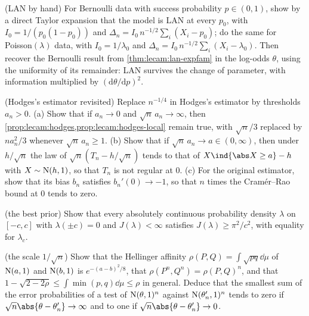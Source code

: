 \begin{refsection}
\begin{exercises}
\item \consolidation (LAN by hand) For Bernoulli data with success probability $p\in(0,1)$, show by a direct Taylor expansion that the model is LAN at every $p_0$, with $I_0=1/(p_0(1-p_0))$ and $\Delta_n=I_0\,n^{-1/2}\sum_i(X_i-p_0)$; do the same for Poisson$(\lambda)$ data, with $I_0=1/\lambda_0$ and $\Delta_n=I_0\,n^{-1/2}\sum_i(X_i-\lambda_0)$. Then recover the Bernoulli result from \cref{thm:lecam:lan-expfam} in the log-odds $\theta$, using the uniformity of its remainder: LAN survives the change of parameter, with information multiplied by $(\mathrm d\theta/\mathrm dp)^2$.\label{ex:lecam:bernoulli}

\item \consolidation\hard (Hodges's estimator revisited) Replace $n^{-1/4}$ in Hodges's estimator by thresholds $a_n>0$. (a) Show that if $a_n\to0$ and $\sqrt n\,a_n\to\infty$, then \cref{prop:lecam:hodges,prop:lecam:hodges-local} remain true, with $\sqrt n/3$ replaced by $na_n^2/3$ whenever $\sqrt n\,a_n\ge1$. (b) Show that if $\sqrt n\,a_n\to a\in(0,\infty)$, then under $h/\sqrt n$ the law of $\sqrt n(T_n-h/\sqrt n)$ tends to that of $X\ind\{\abs X\ge a\}-h$ with $X\sim\mathrm{N}(h,1)$, so that $T_n$ is not regular at $0$. (c) For the original estimator, show that its bias $b_n$ satisfies $b_n'(0)\to-1$, so that $n$ times the Cramér--Rao bound at $0$ tends to zero. \label{ex:lecam:hodges}

\item \consolidation\hard (the best prior) Show that every absolutely continuous probability density $\lambda$ on $[-c,c]$ with $\lambda(\pm c)=0$ and $J(\lambda)<\infty$ satisfies $J(\lambda)\ge\pi^2/c^2$, with equality for $\lambda_c$. \label{ex:lecam:prior}

\item \consolidation (the scale $1/\sqrt n$) Show that the Hellinger affinity $\rho(P,Q)=\int\sqrt{pq}\dd\mu$ of $\mathrm{N}(a,1)$ and $\mathrm{N}(b,1)$ is $e^{-(a-b)^2/8}$, that $\rho(P^n,Q^n)=\rho(P,Q)^n$, and that $1-\sqrt{2-2\rho}\le\int\min(p,q)\dd\mu\le\rho$ in general. Deduce that the smallest sum of the error probabilities of a test of $\mathrm{N}(\theta,1)^n$ against $\mathrm{N}(\theta_n',1)^n$ tends to zero if $\sqrt n\abs{\theta-\theta_n'}\to\infty$ and to one if $\sqrt n\abs{\theta-\theta_n'}\to0$.\label{ex:lecam:hellinger}


\end{exercises}
\end{refsection}
